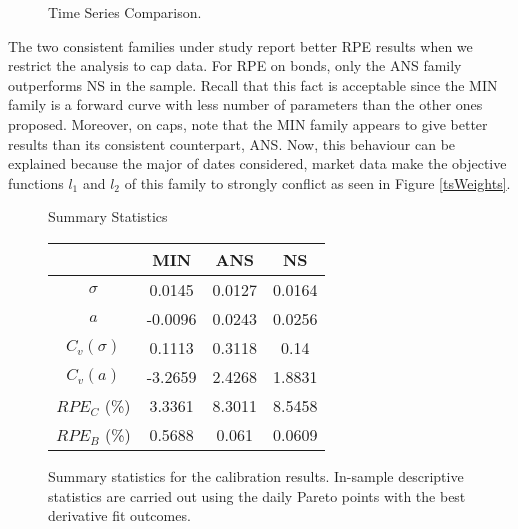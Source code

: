 \begin{figure}[h!]
\centering
\caption{Time Series Comparison. \label{tsComparison}} 
\vskip 1cm

\end{figure}

The two consistent families under study report better RPE results when we
restrict the analysis to cap data. For RPE on bonds, only the ANS
family outperforms NS in the sample. Recall that this fact is
acceptable since the MIN family is a forward curve with less number of
parameters than the other ones proposed. Moreover, on caps, note that
the MIN family appears to give better results than its consistent 
counterpart, ANS. Now, this behaviour can be explained because the
major of dates considered, market data make the objective
functions $l_1$ and $l_2$ of this family to strongly conflict as seen
in Figure \ref{tsWeights}.

\begin{figure}[h!]
\caption{Summary statistics for the calibration results. In-sample
  descriptive statistics are carried out using the daily Pareto points
  with the best derivative fit outcomes.\label{SumStats}} 
\begin{center}
{\sc Summary Statistics}\\[.1cm]
\begin{tabular}{cccc}
\hline \hline
 & MIN & ANS & NS \\
\hline
$\sigma$ & 0.0145 & 0.0127 & 0.0164\\
$a$ & -0.0096 & 0.0243 & 0.0256\\
 $C_v(\sigma)$ & 0.1113 & 0.3118 & 0.14\\
$C_v(a)$ & -3.2659 & 2.4268 & 1.8831\\
$RPE_C$ (\%) & 3.3361 & 8.3011 & 8.5458\\
$RPE_B$ (\%) & 0.5688 & 0.061 & 0.0609\\
\hline
\end{tabular}
\end{center}
\end{figure}

